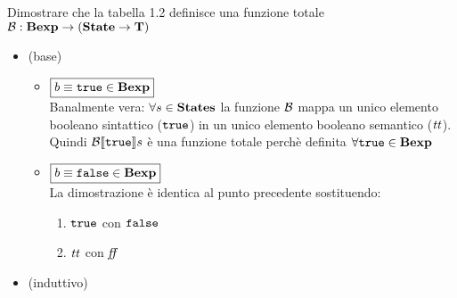 {Dimostrare che la tabella 1.2 definisce una funzione totale 
$\mathcal{B}: \mbox{\textbf{Bexp}} \rightarrow (\mbox{\textbf{State}} \rightarrow \mbox{\textbf{T}})$}
{
\begin{itemize}

  \item (base)
    \begin{itemize}
      
      \item $\boxed{b \equiv \mbox{\tt true} \in \mbox{\textbf{Bexp}}}$ \\
            Banalmente vera: $\forall s \in \mbox{\textbf{States}}$ la funzione $\mathcal{B}$ mappa 
un unico elemento booleano sintattico ($\mbox{\tt true}$) in un unico elemento 
booleano semantico ($\mbox{\textit{tt}}$). Quindi $\mathcal{B} \llbracket \mbox{\tt true} \rrbracket s$ è una funzione totale 
perchè definita $\forall \mbox{\tt true} \in \mbox{\textbf{Bexp}}$
      
      \item $\boxed{b \equiv \mbox{\tt false} \in \mbox{\textbf{Bexp}}}$ \\
            La dimostrazione è identica al punto precedente sostituendo:
            \begin{enumerate}[label=(\alph*)] 
              \item $\mbox{\tt true}$ con $\mbox{\tt false}$
              \item $\mbox{\textit{tt}}$ con $\mbox{\textit{ff}}$
            \end{enumerate} 
 
    \end{itemize}

  \item (induttivo)
    \begin{itemize}
   

\end{itemize}
\end{itemize}}
